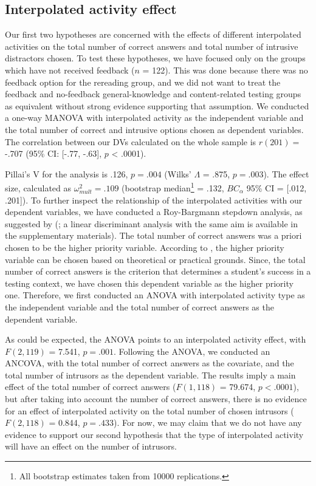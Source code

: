 \documentclass[../main.tex]{subfiles}
\begin{document}
\hypertarget{interpolated-activity-effect}{%
\subsection{Interpolated activity
effect}\label{interpolated-activity-effect}}

Our first two hypotheses are concerned with the effects of different
interpolated activities on the total number of correct answers and total
number of intrusive distractors chosen. To test these hypotheses, we
have focused only on the groups which have not received feedback (\(n\)
= 122). This was done because there was no feedback option for the
rereading group, and we did not want to treat the feedback and
no-feedback general-knowledge and content-related testing groups as
equivalent without strong evidence supporting that assumption. We
conducted a one-way MANOVA with interpolated activity as the independent
variable and the total number of correct and intrusive options chosen as
dependent variables. The correlation between our DVs calculated on the
whole sample is \(r(201) =\) -.707 (95\% CI: {[}-.77, -.63{]}, \(p\)
\textless{} .0001).

Pillai's V for the analysis is .126, \(p = .004\) (Wilks' \(\Lambda\) =
.875, \(p = .003\)). The effect size, calculated as
\(\omega^2_{mult} = .109\) (bootstrap
median\footnote{All bootstrap estimates taken from 10000 replications.}
= .132, \(BC_\alpha\) 95\% CI = {[}.012, .201{]}). To further inspect
the relationship of the interpolated activities with our dependent
variables, we have conducted a Roy-Bargmann stepdown analysis, as
suggested by \citeauthor{tabachnickUsingMultivariateStatistics2012}
(\citeyear{tabachnickUsingMultivariateStatistics2012}; a linear
discriminant analysis with the same aim is available in the
supplementary materials). The total number of correct answers was a
priori chosen to be the higher priority variable. According to
\citet{tabachnickUsingMultivariateStatistics2012}, the higher priority
variable can be chosen based on theoretical or practical grounds. Since,
the total number of correct answers is the criterion that determines a
student's success in a testing context, we have chosen this dependent
variable as the higher priority one. Therefore, we first conducted an
ANOVA with interpolated activity type as the independent variable and
the total number of correct answers as the dependent variable.

As could be expected, the ANOVA points to an interpolated activity
effect, with \(F(2, 119)\) = 7.541, \(p = .001\). Following the ANOVA,
we conducted an ANCOVA, with the total number of correct answers as the
covariate, and the total number of intrusors as the dependent variable.
The results imply a main effect of the total number of correct answers
(\(F(1, 118)\) = 79.674, \(p < .0001\)), but after taking into account
the number of correct answers, there is no evidence for an effect of
interpolated activity on the total number of chosen intrusors
(\(F (2, 118)\) = 0.844, \(p = .433\)). For now, we may claim that we do
not have any evidence to support our second hypothesis that the type of
interpolated activity will have an effect on the number of intrusors.
\end{document}
